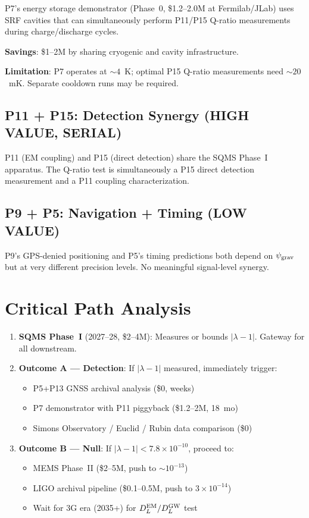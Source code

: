 \documentclass[11pt]{article}
\newcommand{\ee}[1]{\times 10^{#1}}
\begin{document}
P7's energy storage demonstrator (Phase~0, \$1.2--2.0M at Fermilab/JLab)
uses SRF cavities that can simultaneously perform P11/P15 Q-ratio
measurements during charge/discharge cycles.

\textbf{Savings}: \$1--2M by sharing cryogenic and cavity infrastructure.

\textbf{Limitation}: P7 operates at $\sim 4$~K; optimal P15 Q-ratio
measurements need $\sim 20$~mK. Separate cooldown runs may be required.

\subsection{P11 + P15: Detection Synergy (HIGH VALUE, SERIAL)}

P11 (EM coupling) and P15 (direct detection) share the SQMS Phase~I
apparatus. The Q-ratio test is simultaneously a P15 direct detection
measurement and a P11 coupling characterization.

\subsection{P9 + P5: Navigation + Timing (LOW VALUE)}

P9's GPS-denied positioning and P5's timing predictions both depend on
$\psi_{\rm grav}$ but at very different precision levels. No meaningful
signal-level synergy.

\section{Critical Path Analysis}

\begin{enumerate}[nosep]
\item \textbf{SQMS Phase~I} (2027--28, \$2--4M): Measures or bounds
  $|\lambda-1|$. Gateway for all downstream.
\item \textbf{Outcome A --- Detection}: If $|\lambda-1|$ measured,
  immediately trigger:
  \begin{itemize}[nosep]
    \item P5+P13 GNSS archival analysis (\$0, weeks)
    \item P7 demonstrator with P11 piggyback (\$1.2--2M, 18~mo)
    \item Simons Observatory / Euclid / Rubin data comparison (\$0)
  \end{itemize}
\item \textbf{Outcome B --- Null}: If $|\lambda-1| < 7.8\ee{-10}$,
  proceed to:
  \begin{itemize}[nosep]
    \item MEMS Phase~II (\$2--5M, push to $\sim 10^{-13}$)
    \item LIGO archival pipeline (\$0.1--0.5M, push to $3\ee{-14}$)
    \item Wait for 3G era (2035+) for $D_L^{\rm EM}/D_L^{\rm GW}$ test
  \end{itemize}
\end{enumerate}
\end{document}

